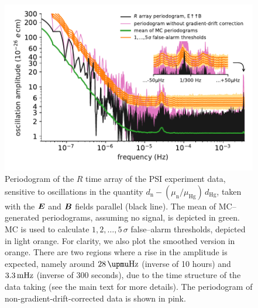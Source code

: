 \begin{figure}
  \centering
  \includegraphics[width=\columnwidth]{gfx/axions/detection_psi_inset_gc.pdf}
  \caption{
  Periodogram of the $R$ time array of the PSI experiment data, sensitive to oscillations in the quantity $d_\mathrm{n} - \left( \mu_\mathrm{n} / \mu_\textrm{Hg} \right) \, d_\textrm{Hg}$, taken with the $\boldsymbol{E}$ and $\boldsymbol{B}$ fields parallel (black line).
  The mean of MC--generated periodograms, assuming no signal, is depicted in green. MC is used to calculate $1,2,…,5\,\sigma$ false--alarm thresholds, depicted in light orange.
  For clarity, we also plot the smoothed version in orange.
  There are two regions where a rise in the amplitude is expected, namely around $\unit[28]{\upmu Hz}$ (inverse of 10 hours) and $\unit[3.3]{mHz}$ (inverse of 300 seconds), due to the time structure of the data taking (see the main text for more details). The periodogram of non-gradient-drift-corrected data is shown in pink.
  }
  \label{fig:PSI_detection}
\end{figure}


